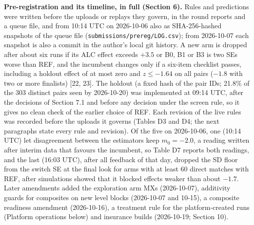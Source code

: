 \documentclass[
]{article}
\begin{document}
\textbf{Pre-registration and its timeline, in full (Section 6).} Rules
and predictions were written before the uploads or replays they govern,
in the round reports and a queue file, and from 10:14 UTC on 2026-10-06
also as SHA-256-hashed snapshots of the queue file
(\texttt{submissions/prereg/LOG.csv}); from 2026-10-07 each snapshot is
also a commit in the author's local git history. A new arm is dropped
after about six runs if its ALC effect exceeds \(+3.5\) or B0, B1 or B3
is two SEs worse than REF, and the incumbent changes only if a six-item
checklist passes, including a holdout effect of at most zero and
\(z \le -1.64\) on all pairs (\(-1.8\) with two or more finalists)
{[}22, 23{]}. The holdout (a fixed hash of the pair IDs; 21.8\% of the
303 distinct pairs seen by 2026-10-20) was implemented at 09:14 UTC,
after the decisions of Section 7.1 and before any decision under the
screen rule, so it gives no clean check of the earlier choice of REF.
Each revision of the live rules was recorded before the uploads it
governs (Tables D3 and D4; the next paragraphs state every rule and
revision). Of the five on 2026-10-06, one (10:14 UTC) let disagreement
between the estimators keep \(m_0 =
-2.0\), a reading written after interim data that favours the incumbent,
so Table D7 reports both readings, and the last (16:03 UTC), after all
feedback of that day, dropped the SD floor from the switch SE at the
final look for arms with at least 60 direct matches with REF, after
simulations showed that it blocked effects weaker than about \(-1.7\).
Later amendments added the exploration arm MXs (2026-10-07), additivity
guards for composites on new level blocks (2026-10-07 and 10-15), a
composite readiness amendment (2026-10-16), a treatment rule for the
platform-created runs (Platform operations below) and insurance builds
(2026-10-19; Section 10).
\end{document}
